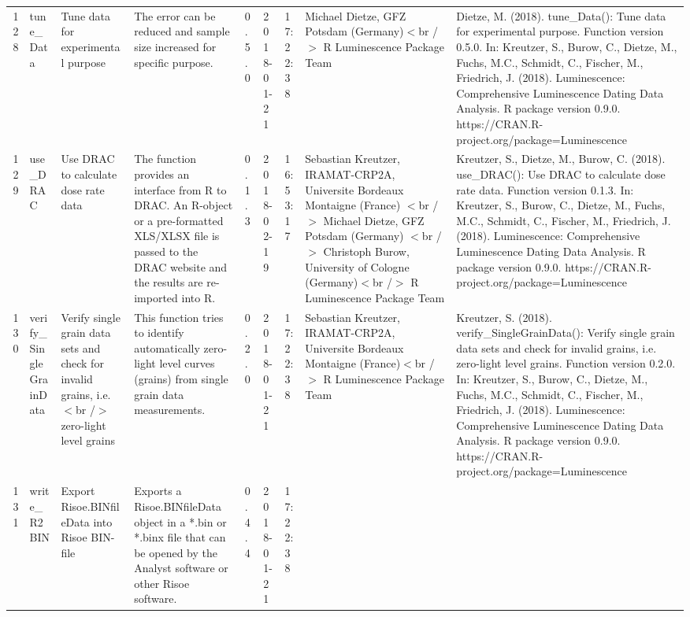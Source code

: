 \begin{table}[ht]
\begin{tabular}{rllllllll}
 \\ 
  128 & tune\_Data & Tune data for experimental purpose & The error can be reduced and sample size increased for specific purpose. & 0.5.0 & 2018-01-21 & 17:22:38
 & Michael Dietze, GFZ Potsdam (Germany)$<$br /$>$  R Luminescence Package Team & Dietze, M. (2018). tune\_Data(): Tune data for experimental purpose. Function version 0.5.0. In: Kreutzer, S., Burow, C., Dietze, M., Fuchs, M.C., Schmidt, C., Fischer, M., Friedrich, J. (2018). Luminescence: Comprehensive Luminescence Dating Data Analysis. R package version 0.9.0. https://CRAN.R-project.org/package=Luminescence
 \\ 
  129 & use\_DRAC & Use DRAC to calculate dose rate data & The function provides an interface from R to DRAC. An R-object or a pre-formatted XLS/XLSX file is passed to the DRAC website and the results are re-imported into R. & 0.1.3 & 2018-02-19 & 16:53:17
 & Sebastian Kreutzer, IRAMAT-CRP2A, Universite Bordeaux Montaigne (France) $<$br /$>$ Michael Dietze, GFZ Potsdam (Germany) $<$br /$>$ Christoph Burow, University of Cologne (Germany)$<$br /$>$  R Luminescence Package Team & Kreutzer, S., Dietze, M., Burow, C. (2018). use\_DRAC(): Use DRAC to calculate dose rate data. Function version 0.1.3. In: Kreutzer, S., Burow, C., Dietze, M., Fuchs, M.C., Schmidt, C., Fischer, M., Friedrich, J. (2018). Luminescence: Comprehensive Luminescence Dating Data Analysis. R package version 0.9.0. https://CRAN.R-project.org/package=Luminescence
 \\ 
  130 & verify\_SingleGrainData & Verify single grain data sets and check for invalid grains, i.e.$<$br /$>$ zero-light level grains & This function tries to identify automatically zero-light level curves (grains) from single grain data measurements. & 0.2.0 & 2018-01-21 & 17:22:38
 & Sebastian Kreutzer, IRAMAT-CRP2A, Universite Bordeaux Montaigne (France)$<$br /$>$  R Luminescence Package Team & Kreutzer, S. (2018). verify\_SingleGrainData(): Verify single grain data sets and check for invalid grains, i.e. zero-light level grains. Function version 0.2.0. In: Kreutzer, S., Burow, C., Dietze, M., Fuchs, M.C., Schmidt, C., Fischer, M., Friedrich, J. (2018). Luminescence: Comprehensive Luminescence Dating Data Analysis. R package version 0.9.0. https://CRAN.R-project.org/package=Luminescence
 \\ 
  131 & write\_R2BIN & Export Risoe.BINfileData into Risoe BIN-file & Exports a Risoe.BINfileData object in a *.bin or *.binx file that can be opened by the Analyst software or other Risoe software. & 0.4.4 & 2018-01-21 & 17:22:38

\end{tabular}
\end{table}
